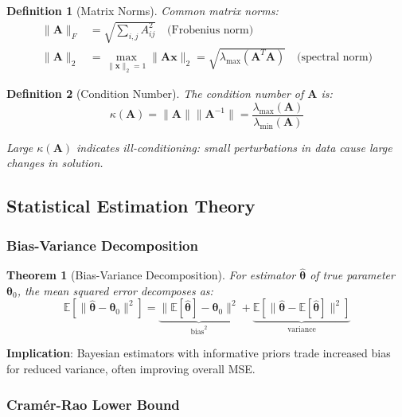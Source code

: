 \documentclass[11pt]{article}
\newtheorem{theorem}{Theorem}[section]
\newtheorem{definition}{Definition}[section]
\begin{document}
\begin{definition}[Matrix Norms]
Common matrix norms:
\begin{align}
\|\mathbf{A}\|_F &= \sqrt{\sum_{i,j} A_{ij}^2} \quad \text{(Frobenius norm)} \\
\|\mathbf{A}\|_2 &= \max_{\|\mathbf{x}\|_2=1} \|\mathbf{A}\mathbf{x}\|_2 = \sqrt{\lambda_{\max}(\mathbf{A}^T\mathbf{A})} \quad \text{(spectral norm)}
\end{align}
\end{definition}

\begin{definition}[Condition Number]
The condition number of $\mathbf{A}$ is:
\begin{equation}
\kappa(\mathbf{A}) = \|\mathbf{A}\| \|\mathbf{A}^{-1}\| = \frac{\lambda_{\max}(\mathbf{A})}{\lambda_{\min}(\mathbf{A})}
\end{equation}

Large $\kappa(\mathbf{A})$ indicates ill-conditioning: small perturbations in data cause large changes in solution.
\end{definition}

\subsection{Statistical Estimation Theory}

\subsubsection{Bias-Variance Decomposition}

\begin{theorem}[Bias-Variance Decomposition]
For estimator $\hat{\bm{\theta}}$ of true parameter $\bm{\theta}_0$, the mean squared error decomposes as:
\begin{equation}
\mathbb{E}[\|\hat{\bm{\theta}} - \bm{\theta}_0\|^2] = \underbrace{\|\mathbb{E}[\hat{\bm{\theta}}] - \bm{\theta}_0\|^2}_{\text{bias}^2} + \underbrace{\mathbb{E}[\|\hat{\bm{\theta}} - \mathbb{E}[\hat{\bm{\theta}}]\|^2]}_{\text{variance}}
\end{equation}
\end{theorem}

\textbf{Implication}: Bayesian estimators with informative priors trade increased bias for reduced variance, often improving overall MSE.

\subsubsection{Cramér-Rao Lower Bound}
\end{document}
